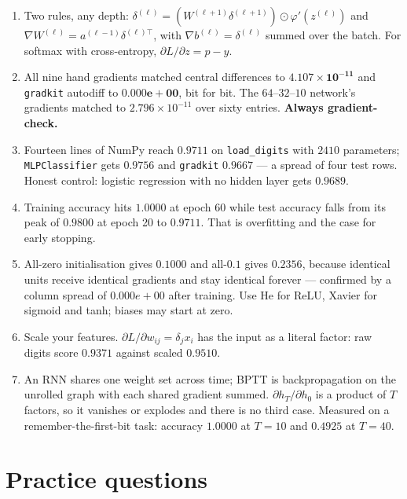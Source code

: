 \documentclass[11pt]{article}
\begin{document}
\begin{enumerate}[leftmargin=*]
    $\delta_3 = -0.1330107147$, $\delta_1 = -0.0133010715$,
    $\delta_2 = +0.0156908963$, and nine gradients from $-0.1330$ to
    $+0.0314$.
  \item Two rules, any depth:
    $\delta^{(\ell)} = (W^{(\ell+1)}\delta^{(\ell+1)})\odot\varphi'(z^{(\ell)})$
    and $\nabla W^{(\ell)} = a^{(\ell-1)}\delta^{(\ell)\top}$, with
    $\nabla b^{(\ell)} = \delta^{(\ell)}$ summed over the batch. For softmax
    with cross-entropy, $\partial L/\partial z = p - y$.
  \item All nine hand gradients matched central differences to
    $\mathbf{4.107\times10^{-11}}$ and \texttt{gradkit} autodiff to
    $\mathbf{0.000e{+}00}$, bit for bit. The $64$--$32$--$10$ network's
    gradients matched to $2.796\times10^{-11}$ over sixty entries.
    \textbf{Always gradient-check.}
  \item Fourteen lines of NumPy reach $\mathbf{0.9711}$ on
    \texttt{load\_digits} with $2410$ parameters; \texttt{MLPClassifier} gets
    $0.9756$ and \texttt{gradkit} $0.9667$ --- a spread of four test rows.
    Honest control: logistic regression with no hidden layer gets $0.9689$.
  \item Training accuracy hits $1.0000$ at epoch 60 while test accuracy falls
    from its peak of $0.9800$ at epoch 20 to $0.9711$. That is overfitting and
    the case for early stopping.
  \item All-zero initialisation gives $\mathbf{0.1000}$ and all-$0.1$ gives
    $0.2356$, because identical units receive identical gradients and stay
    identical forever --- confirmed by a column spread of $0.000e{+}00$ after
    training. Use He for ReLU, Xavier for sigmoid and tanh; biases may start
    at zero.
  \item Scale your features. $\partial L/\partial w_{ij} = \delta_j x_i$ has
    the input as a literal factor: raw digits score $0.9371$ against scaled
    $0.9510$.
  \item An RNN shares one weight set across time; BPTT is backpropagation on
    the unrolled graph with each shared gradient summed.
    $\partial h_T/\partial h_0$ is a product of $T$ factors, so it vanishes or
    explodes and there is no third case. Measured on a remember-the-first-bit
    task: accuracy $1.0000$ at $T=10$ and $\mathbf{0.4925}$ at $T=40$.
\end{enumerate}

\section{Practice questions}
\label{sec:practice}
\end{document}
